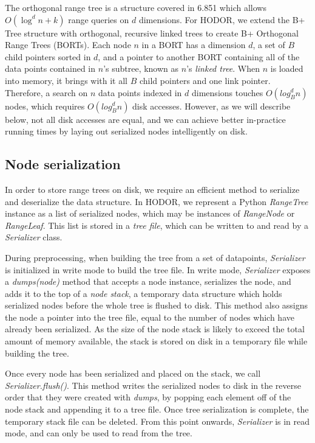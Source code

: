 \documentclass[11pt, oneside]{article}
\newcommand{\ms}{\textit}
\begin{document}
The orthogonal range tree is a structure covered in 6.851 which allows
$O(\log^d n + k)$ range queries on $d$ dimensions. For HODOR, we extend the B+
Tree structure with orthogonal, recursive linked trees to create B+ Orthogonal
Range Trees (BORTs). Each node $n$ in a BORT has a dimension $d$, a set of $B$
child pointers sorted in $d$, and a pointer to another BORT containing all of
the data points contained in $n$'s subtree, known as $n$'s \textit{linked
tree}. When $n$ is loaded into memory, it brings with it all $B$ child pointers
and one link pointer. Therefore, a search on $n$ data points indexed in $d$
dimensions touches $O(log^d_B n)$ nodes, which requires $O(log^d_B n)$ disk
accesses.  However, as we will describe below, not all disk accesses are equal,
and we can achieve better in-practice running times by laying out serialized
nodes intelligently on disk.

\subsection{Node serialization}

In order to store range trees on disk, we require an efficient method to
serialize and deserialize the data structure. In HODOR, we represent a Python
\ms{RangeTree} instance as a list of serialized nodes, which may be instances of
\ms{RangeNode} or \ms{RangeLeaf}. This list is stored in a \textit{tree file}, which
can be written to and read by a \ms{Serializer} class. 

During preprocessing, when building the tree from a set of datapoints,
\ms{Serializer} is initialized in write mode to build the tree file. In write
mode, \ms{Serializer} exposes a \ms{dumps(node)} method that accepts a
node instance, serializes the node, and adds it to the top of a \textit{node stack},
a temporary data structure which holds serialized nodes before the whole tree is
flushed to disk. This method also assigns the node a pointer into the tree file,
equal to the number of nodes which have already been serialized. As the size of
the node stack is likely to exceed the total amount of memory available, the
stack is stored on disk in a temporary file while building the tree. 

Once every node has been serialized and placed on the stack, we call
\ms{Serializer.flush()}. This method writes the serialized nodes to disk in the
reverse order that they were created with \ms{dumps}, by popping each element
off of the node stack and appending it to a tree file. Once tree serialization
is complete, the temporary stack file can be deleted. From this point onwards,
\ms{Serializer} is in read mode, and can only be used to read from the tree.
\end{document}
